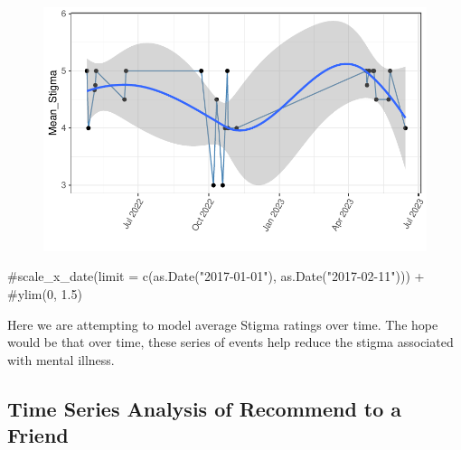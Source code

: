\documentclass[
  letterpaper,
  DIV=11,
  numbers=noendperiod]{scrartcl}
\newenvironment{Shaded}{\begin{snugshade}}{\end{snugshade}}
\newcommand{\CommentTok}[1]{\textcolor[rgb]{0.37,0.37,0.37}{#1}}
\begin{document}
\begin{figure}[H]

{\centering \includegraphics{ytp_post_event_survey_files/figure-pdf/unnamed-chunk-19-1.pdf}

}

\end{figure}

\begin{Shaded}
\begin{Highlighting}[]
  \CommentTok{\#scale\_x\_date(limit = c(as.Date("2017{-}01{-}01"), as.Date("2017{-}02{-}11"))) +}
  \CommentTok{\#ylim(0, 1.5)}
\end{Highlighting}
\end{Shaded}

Here we are attempting to model average Stigma ratings over time. The
hope would be that over time, these series of events help reduce the
stigma associated with mental illness.

\hypertarget{time-series-analysis-of-recommend-to-a-friend}{%
\subsection{Time Series Analysis of Recommend to a
Friend}\label{time-series-analysis-of-recommend-to-a-friend}}
\end{document}
